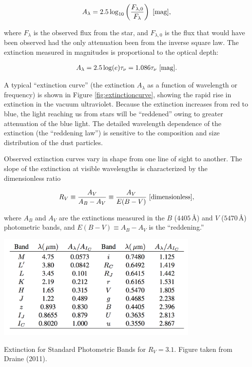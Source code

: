 \documentclass[a4paper,10pt]{article}
\begin{document}
\begin{align*}
    A_\lambda = 2.5\log_{10}\left(\frac{F_{\lambda,0}}{F_\lambda}\right) ~ [{\rm mag}],
\end{align*}

{\noindent}where $F_\lambda$ is the observed flux from the star, and $F_{\lambda,0}$ is the flux that would have been observed had the only attenuation been from the inverse square law. The extinction measured in magnitudes is proportional to the optical depth:

\begin{align*}
    A_\lambda = 2.5\log(e)\tau_\nu = 1.086\tau_\nu ~ [{\rm mag}].
\end{align*}

{\noindent}A typical ``extinction curve'' (the extinction $A_\lambda$ as a function of wavelength or frequency) is shown in Figure \ref{fig:extinctioncurve}, showing the rapid rise in extinction in the vacuum ultraviolet. Because the extinction increases from red to blue, the light reaching us from stars will be ``reddened'' owing to greater attenuation of the blue light. The detailed wavelength dependence of the extinction (the ``reddening law'') is sensitive to the composition and size distribution of the dust particles. 

{\noindent}Observed extinction curves vary in shape from one line of sight to another. The slope of the extinction at visible wavelengths is characterized by the dimensionless ratio

\begin{align*}
    R_V \equiv \frac{A_V}{A_B-A_V} \equiv \frac{A_V}{E(B-V)} ~ [{\rm dimensionless}],
\end{align*}

{\noindent}where $A_B$ and $A_V$ are the extinctions measured in the $B$ ($4405$\,\AA) and $V$ ($5470$\,\AA) photometric bands, and $E(B-V)\equiv A_B-A_V$ is the ``reddening.''

\begin{table}[t]
    \centering
    \includegraphics[width=10cm]{figures/ExtinctionTable.png}
    \caption{\footnotesize{Extinction for Standard Photometric Bands for $R_V=3.1$. Figure taken from Draine (2011).}}
    \label{table:extinctiontable}
\end{table}
\end{document}
